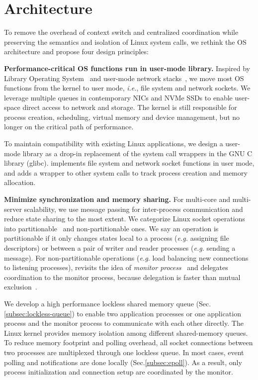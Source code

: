 \section{Architecture}
\label{sec:architecture}

To remove the overhead of context switch and centralized coordination while preserving the semantics and isolation of Linux system calls, we rethink the OS architecture and propose four design principles:

\textbf{Performance-critical OS functions run in user-mode library.}
Inspired by Library Operating System~ and user-mode network stacks~, we move most OS functions from the kernel to user mode, \textit{i.e.}, file system and network sockets. We leverage multiple queues in contemporary NICs and NVMe SSDs to enable user-space direct access to network and storage. The kernel is still responsible for process creation, scheduling, virtual memory and device management, but no longer on the critical path of performance.

To maintain compatibility with existing Linux applications, we design a user-mode library \libipc as a drop-in replacement of the system call wrappers in the GNU C library (glibc). \libipc implements file system and network socket functions in user mode, and adds a wrapper to other system calls to track process creation and memory allocation.

\textbf{Minimize synchronization and memory sharing.}
For multi-core and multi-server scalability, we use message passing for inter-process communication and reduce state sharing to the most extent. We categorize Linux socket operations into partitionable~\cite{partitionable} and non-partitionable ones. We say an operation is partitionable if it only changes states local to a process (\textit{e.g.} assigning file descriptors) or between a pair of writer and reader processes (\textit{e.g.} sending a message). For non-partitionable operations (\textit{e.g.} load balancing new connections to listening processes), \libipc revisits the idea of \textit{monitor process}~\cite{hoare1974monitors} and delegates coordination to the monitor process, because delegation is faster than mutual exclusion~\cite{roghanchi2017ffwd}.

We develop a high performance lockless shared memory queue (Sec.\ref{subsec:lockless-queue}) to enable two application processes or one application process and the monitor process to communicate with each other directly. The Linux kernel provides memory isolation among different shared-memory queues. To reduce memory footprint and polling overhead, all socket connections between two processes are multiplexed through one lockless queue. In most cases, event polling and notifications are done locally (Sec.\ref{subsec:epoll}). As a result, only process initialization and connection setup are coordinated by the monitor.

